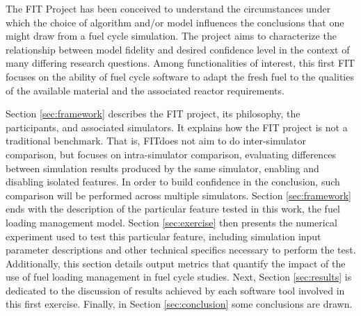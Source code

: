 The \gls{FIT} Project has been conceived to understand the circumstances under which the choice of algorithm and/or model influences the conclusions that one might draw from a fuel cycle simulation.
The project aims to characterize the relationship between model fidelity and desired confidence level in the context of many differing research questions.
Among functionalities of interest, this first \gls{FIT} focuses on the ability of fuel cycle software to adapt the fresh fuel to the qualities of the available material and the associated reactor requirements.

Section \ref{sec:framework} describes the \gls{FIT} project, its philosophy, the participants, and associated simulators.
It explains how the \gls{FIT} project is not a traditional benchmark.
That is, \gls{FIT}does not aim to do inter-simulator comparison, but focuses on intra-simulator comparison, evaluating differences between simulation results produced by the same simulator, enabling and disabling isolated features.
In order to build confidence in the conclusion, such comparison will be performed across multiple simulators.
Section \ref{sec:framework} ends with the description of the particular feature tested in this work, the fuel loading management model.
Section \ref{sec:exercise} then presents the numerical experiment used to test this particular feature, including simulation input parameter descriptions and other technical specifics necessary to perform the test.
Additionally, this section details output metrics that quantify the impact of the use of fuel loading management in fuel cycle studies.
Next, Section \ref{sec:results} is dedicated to the discussion of results achieved by each software tool involved in this first exercise.
Finally, in Section \ref{sec:conclusion} some conclusions are drawn.
